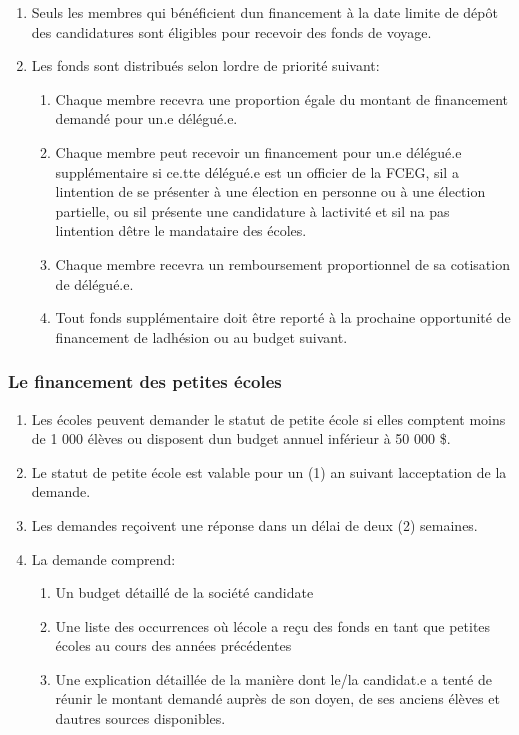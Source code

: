 \begin{enumerate}
 \item
  Seuls les membres qui bénéficient d\textquotesingle un financement à la date limite de dépôt des candidatures sont éligibles pour recevoir des fonds de voyage.
 \item
  Les fonds sont distribués selon l\textquotesingle ordre de priorité suivant:

  \begin{enumerate}
   \item
    Chaque membre recevra une proportion égale du montant de financement demandé pour un.e délégué.e.
   \item
    Chaque membre peut recevoir un financement pour un.e délégué.e supplémentaire si ce.tte délégué.e est un officier de la FCEG, s\textquotesingle il a l\textquotesingle intention de se présenter à une élection en personne ou à une élection partielle, ou s\textquotesingle il présente une candidature à l\textquotesingle activité et s\textquotesingle il n\textquotesingle a pas l\textquotesingle intention d\textquotesingle être le mandataire des écoles.
   \item
    Chaque membre recevra un remboursement proportionnel de sa cotisation de délégué.e.
   \item
    Tout fonds supplémentaire doit être reporté à la prochaine opportunité de financement de l\textquotesingle adhésion ou au budget suivant.
  \end{enumerate}
\end{enumerate}

\subsubsection{Le financement des petites écoles}
\label{le-financement-des-petites-ecoles}

\begin{enumerate}
 \item
  Les écoles peuvent demander le statut de petite école si elles comptent moins de 1 000 élèves ou disposent d\textquotesingle un budget annuel inférieur à 50 000 \$.
 \item
  Le statut de petite école est valable pour un (1) an suivant l\textquotesingle acceptation de la demande.
 \item
  Les demandes reçoivent une réponse dans un délai de deux (2) semaines.
 \item
  La demande comprend:

  \begin{enumerate}
   \item
    Un budget détaillé de la société candidate
   \item
    Une liste des occurrences où l\textquotesingle école a reçu des fonds en tant que petites écoles au cours des années précédentes
   \item
    Une explication détaillée de la manière dont le/la candidat.e a tenté de réunir le montant demandé auprès de son doyen, de ses anciens élèves et d\textquotesingle autres sources disponibles.
  \end{enumerate}
\end{enumerate}


